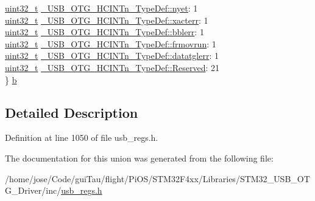\begin{DoxyCompactItemize}
\begin{tabbing}
\>\hyperlink{stdint_8h_a435d1572bf3f880d55459d9805097f62}{uint32\_t} \hyperlink{group___u_s_b___o_t_g___d_r_i_v_e_r_gac351ade1b77042f81f65ddd7595c9de3}{\_USB\_OTG\_HCINTn\_TypeDef::nyet}: 1\\
\>\hyperlink{stdint_8h_a435d1572bf3f880d55459d9805097f62}{uint32\_t} \hyperlink{group___u_s_b___o_t_g___d_r_i_v_e_r_ga75471b6f02970a40515aadb94078073c}{\_USB\_OTG\_HCINTn\_TypeDef::xacterr}: 1\\
\>\hyperlink{stdint_8h_a435d1572bf3f880d55459d9805097f62}{uint32\_t} \hyperlink{group___u_s_b___o_t_g___d_r_i_v_e_r_ga4d85c4c35ee2da38a3840383ca9c32d4}{\_USB\_OTG\_HCINTn\_TypeDef::bblerr}: 1\\
\>\hyperlink{stdint_8h_a435d1572bf3f880d55459d9805097f62}{uint32\_t} \hyperlink{group___u_s_b___o_t_g___d_r_i_v_e_r_ga13ee644f45e41eadec5cc5594fe3f99a}{\_USB\_OTG\_HCINTn\_TypeDef::frmovrun}: 1\\
\>\hyperlink{stdint_8h_a435d1572bf3f880d55459d9805097f62}{uint32\_t} \hyperlink{group___u_s_b___o_t_g___d_r_i_v_e_r_ga621d2d8b151d63f3ae5906c73e185750}{\_USB\_OTG\_HCINTn\_TypeDef::datatglerr}: 1\\
\>\hyperlink{stdint_8h_a435d1572bf3f880d55459d9805097f62}{uint32\_t} \hyperlink{group___u_s_b___o_t_g___d_r_i_v_e_r_ga1eeb2f9bd4676b6bd548c4ef0114ebc8}{\_USB\_OTG\_HCINTn\_TypeDef::Reserved}: 21\\
\} \hyperlink{group___u_s_b___o_t_g___d_r_i_v_e_r_gafc73126993a44639483fc2dc4279ea9d}{b}\\

\end{tabbing}\end{DoxyCompactItemize}


\subsection{Detailed Description}


Definition at line 1050 of file usb\-\_\-regs.\-h.



The documentation for this union was generated from the following file\-:\begin{DoxyCompactItemize}
\item 
/home/jose/\-Code/gui\-Tau/flight/\-Pi\-O\-S/\-S\-T\-M32\-F4xx/\-Libraries/\-S\-T\-M32\-\_\-\-U\-S\-B\-\_\-\-O\-T\-G\-\_\-\-Driver/inc/\hyperlink{_s_t_m32_f4xx_2_libraries_2_s_t_m32___u_s_b___o_t_g___driver_2inc_2usb__regs_8h}{usb\-\_\-regs.\-h}\end{DoxyCompactItemize}
